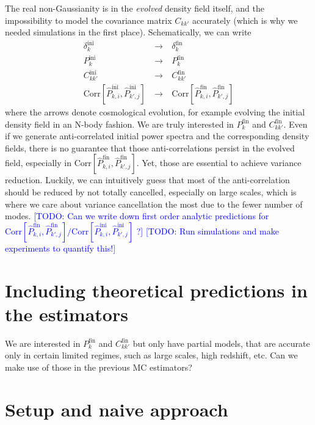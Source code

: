 \documentclass{aastex6}
\newcommand{\eqn}[1]{\begin{eqnarray}#1\end{eqnarray}}
\newcommand{\todo}[1]{\textcolor{blue}{[TODO: #1]}}
\begin{document}
The real non-Gaussianity is in the \textit{evolved} density field itself, and the impossibility to model the covariance matrix $C_{kk'}$ accurately (which is why we needed simulations in the first place).  Schematically, we can write
\eqn{
	\delta^\mathrm{ini}_k \ &\longrightarrow& \ \delta^\mathrm{fin}_k	\nonumber\\
	P^\mathrm{ini}_k \ &\longrightarrow& \ P^\mathrm{fin}_k	\nonumber\\
	C_{kk'}^\mathrm{ini}  \ &\longrightarrow& \ C_{kk'}^\mathrm{fin} \nonumber\\
	\mathrm{Corr}[\hat{P}^\mathrm{ini}_{k, i}, \hat{P}^\mathrm{ini}_{k', j}]  \ &\longrightarrow& \ \mathrm{Corr}[\hat{P}^\mathrm{fin}_{k, i}, \hat{P}^\mathrm{fin}_{k', j}]   \nonumber
}
where the arrows denote cosmological evolution, for example evolving the initial density field in an N-body fashion. 
We are truly interested in $P^\mathrm{fin}_k$ and $C_{kk'}^\mathrm{fin}$.
Even if we generate anti-correlated initial power spectra and the corresponding density fields, there is no guarantee that those anti-correlations persist in the evolved field, especially in $\mathrm{Corr}[\hat{P}^\mathrm{fin}_{k, i}, \hat{P}^\mathrm{fin}_{k', j}]$. 
Yet, those are essential to achieve variance reduction.
Luckily, we can intuitively guess that most of the anti-correlation should be reduced by not totally cancelled, especially on large scales, which is where we care about variance cancellation the most due to the fewer number of modes.
\todo{Can we write down first order analytic predictions for $\mathrm{Corr}[\hat{P}^\mathrm{fin}_{k, i}, \hat{P}^\mathrm{fin}_{k', j}] / \mathrm{Corr}[\hat{P}^\mathrm{ini}_{k, i}, \hat{P}^\mathrm{ini}_{k', j}]$ ?}
\todo{Run simulations and make experiments to quantify this!}



\section{Including theoretical predictions in the estimators}

We are interested in $P^\mathrm{fin}_k$ and $C_{kk'}^\mathrm{fin}$ but only have partial models, that are accurate only in certain limited regimes, such as large scales, high redshift, etc. 
Can we make use of those in the previous MC estimators?

\section{Setup and naive approach}
\end{document}
